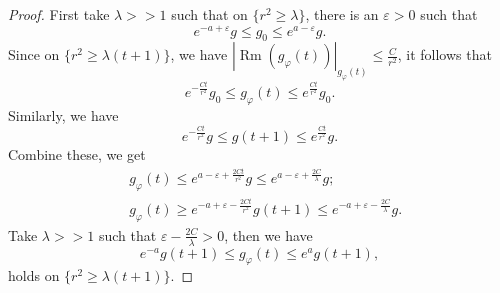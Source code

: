 \documentclass[10pt,a4paper]{amsart}
\def\Rm{\operatorname{Rm}}
\begin{document}
\begin{proof}
    First take $\lambda>>1$ such that on $\{r^2\ge\lambda\}$, there is an $\varepsilon>0$ such that
    \begin{equation*}
       e^{-a+\varepsilon}g \le g_0\le e^{a-\varepsilon}g.   
    \end{equation*}
Since on $\{r^2\ge\lambda(t+1)\}$, we have $|\Rm(g_\varphi(t))|_{g_\varphi(t)}\le \frac{C}{r^2}$, it follows that
\begin{equation*}
    e^{-\frac{Ct}{r^2}}g_0\le g_\varphi(t)\le e^{\frac{Ct}{r^2}}g_0.
\end{equation*}
Similarly, we have
\begin{equation*}
    e^{-\frac{Ct}{r^2}}g\le g(t+1)\le e^{\frac{Ct}{r^2}}g.
\end{equation*}
Combine these, we get
\begin{equation*}
   \begin{split}
        &g_\varphi(t)\le e^{a-\varepsilon+\frac{2Ct}{r^2}}g\le e^{a-\varepsilon+\frac{2C}{\lambda}}g;\\
        &g_\varphi(t)\ge e^{-a+\varepsilon-\frac{2Ct}{r^2}}g(t+1)\le e^{-a+\varepsilon-\frac{2C}{\lambda}}g.
   \end{split}
\end{equation*}
Take $\lambda>>1$ such that $\varepsilon-\frac{2C}{\lambda}>0$, then we have 
\begin{equation*}
    e^{-a}g(t+1)\le g_\varphi(t)\le e^ag(t+1),
\end{equation*}
holds on $\{r^2\ge\lambda(t+1)\}$.
   

\end{proof}
\end{document}
